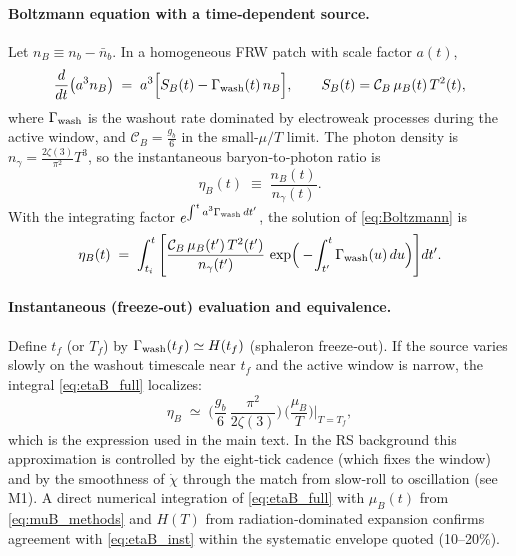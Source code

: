 \documentclass[11pt]{article}
\begin{document}
\paragraph{Boltzmann equation with a time‑dependent source.}
Let \(n_B\equiv n_b-\bar n_b\). In a homogeneous FRW patch with scale factor \(a(t)\),
\begin{equation}
  \frac{d}{dt}\big(a^3 n_B\big) \;=\; a^3\Big[S_B(t) - \Gamma_{\rm wash}(t)\,n_B\Big],
  \qquad
  S_B(t)=\mathcal{C}_B\,\mu_B(t)\,T^2(t),
  \label{eq:Boltzmann}
\end{equation}
where \(\Gamma_{\rm wash}\) is the washout rate dominated by electroweak processes during the active window, and \(\mathcal{C}_B=\tfrac{g_b}{6}\) in the small‑\(\mu/T\) limit. The photon density is \(n_\gamma=\tfrac{2\zeta(3)}{\pi^2}T^3\), so the instantaneous baryon‑to‑photon ratio is
\begin{equation}
  \eta_B(t)\;\equiv\;\frac{n_B(t)}{n_\gamma(t)}.
\end{equation}
With the integrating factor \(e^{\int^t a^3\Gamma_{\rm wash}\,dt'}\), the solution of \eqref{eq:Boltzmann} is
\begin{equation}
  \eta_B(t)
  \;=\;
  \int_{t_i}^{t}
  \Bigg[
    \frac{\mathcal{C}_B\,\mu_B(t')\,T^2(t')}{n_\gamma(t')}
    \,\exp\!\Big(-\!\int_{t'}^{t}\Gamma_{\rm wash}(u)\,du\Big)
  \Bigg] dt'.
  \label{eq:etaB_full}
\end{equation}

\paragraph{Instantaneous (freeze‑out) evaluation and equivalence.}
Define \(t_f\) (or \(T_f\)) by \(\Gamma_{\rm wash}(t_f)\simeq H(t_f)\) (sphaleron freeze‑out). If the source varies slowly on the washout timescale near \(t_f\) and the active window is narrow, the integral \eqref{eq:etaB_full} localizes:
\begin{equation}
  \eta_B \;\simeq\; 
  \Big(\frac{g_b}{6}\,\frac{\pi^2}{2\zeta(3)}\Big)\,
  \Big(\frac{\mu_B}{T}\Big)\Big|_{T=T_f},
  \label{eq:etaB_inst}
\end{equation}
which is the expression used in the main text. In the RS background this approximation is controlled by the eight‑tick cadence (which fixes the window) and by the smoothness of \(\dot\chi\) through the match from slow‑roll to oscillation (see M1). A direct numerical integration of \eqref{eq:etaB_full} with \(\mu_B(t)\) from \eqref{eq:muB_methods} and \(H(T)\) from radiation‑dominated expansion confirms agreement with \eqref{eq:etaB_inst} within the systematic envelope quoted (10–20\%).
\end{document}
